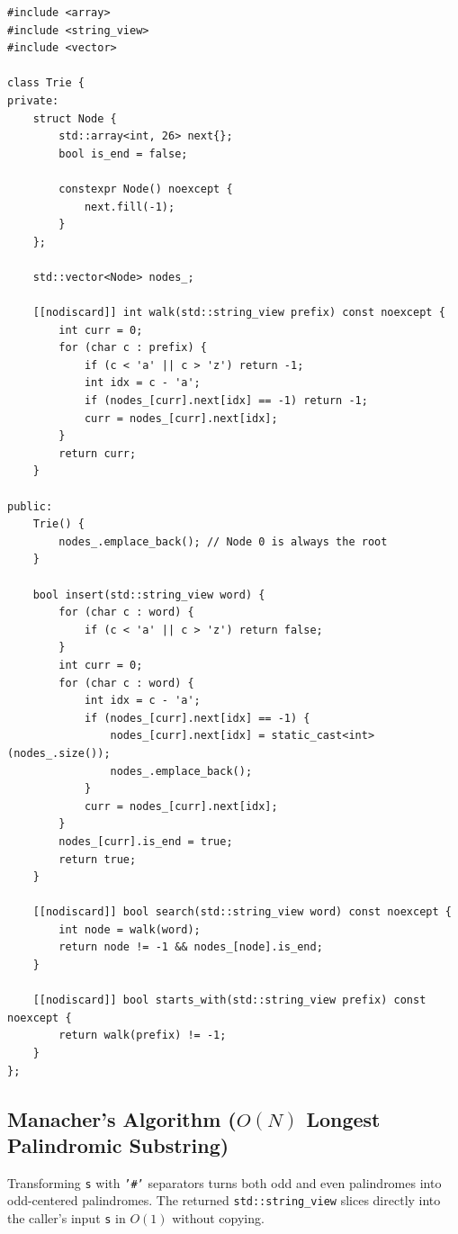 \documentclass[11pt,a4paper]{article}
\theoremstyle{definition}
\begin{document}
\begin{lstlisting}[caption={Pointerless Vector-Pool Trie with insert, search, and starts\_with}]
#include <array>
#include <string_view>
#include <vector>

class Trie {
private:
    struct Node {
        std::array<int, 26> next{};
        bool is_end = false;

        constexpr Node() noexcept {
            next.fill(-1);
        }
    };

    std::vector<Node> nodes_;

    [[nodiscard]] int walk(std::string_view prefix) const noexcept {
        int curr = 0;
        for (char c : prefix) {
            if (c < 'a' || c > 'z') return -1;
            int idx = c - 'a';
            if (nodes_[curr].next[idx] == -1) return -1;
            curr = nodes_[curr].next[idx];
        }
        return curr;
    }

public:
    Trie() {
        nodes_.emplace_back(); // Node 0 is always the root
    }

    bool insert(std::string_view word) {
        for (char c : word) {
            if (c < 'a' || c > 'z') return false;
        }
        int curr = 0;
        for (char c : word) {
            int idx = c - 'a';
            if (nodes_[curr].next[idx] == -1) {
                nodes_[curr].next[idx] = static_cast<int>(nodes_.size());
                nodes_.emplace_back();
            }
            curr = nodes_[curr].next[idx];
        }
        nodes_[curr].is_end = true;
        return true;
    }

    [[nodiscard]] bool search(std::string_view word) const noexcept {
        int node = walk(word);
        return node != -1 && nodes_[node].is_end;
    }

    [[nodiscard]] bool starts_with(std::string_view prefix) const noexcept {
        return walk(prefix) != -1;
    }
};
\end{lstlisting}

\subsection{Manacher's Algorithm ($O(N)$ Longest Palindromic Substring)}

Transforming \texttt{s} with \texttt{'\#'} separators turns both odd and even palindromes into odd-centered palindromes. The returned \texttt{std::string\_view} slices directly into the caller's input \texttt{s} in $O(1)$ without copying.
\end{document}
